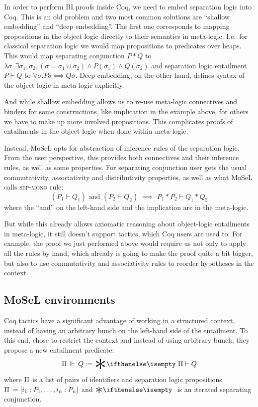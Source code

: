 In order to perform BI proofs inside Coq, we need to embed separation logic into Coq.
This is an old problem and two most common solutions are ``shallow embedding'' and ``deep embedding''.
The first one corresponds to mapping propositions in the object logic directly to their semantics in meta-logic.
I.e.\ for classical separation logic we would map propositions to predicates over heaps.
This would map separating conjunction \(P * Q\) to \(\lambda \sigma.\,\exists\sigma_1, \sigma_2.\, \left(\sigma = \sigma_1 \uplus \sigma_2\right) \wedge P (\sigma_1) \wedge Q(\sigma_2)\) and separation logic entailment \(P \vdash Q\) to \(\forall \sigma. P \sigma \implies Q \sigma\).
Deep embedding, on the other hand, defines syntax of the object logic in meta-logic explicitly.

And while shallow embedding allows us to re-use meta-logic connectives and binders for some constructions, like implication in the example above, for others we have to make up more involved propositions.
This complicates proofs of entailments in the object logic when done within meta-logic.

Instead, MoSeL opts for abstraction of inference rules of the separation logic.
From the user perspective, this provides both connectives and their inference rules, as well as some properties.
For separating conjunction user gets the usual commutativity, associativity and distributivity properties, as well as what MoSeL calls \textsc{sep-mono} rule:
\[(P_1 \vdash Q_1) \text{ and } (P_2 \vdash Q_2) \,\, \implies \,\, P_1 * P_2 \vdash Q_1 * Q_2\]
where the ``and'' on the left-hand side and the implication are in the meta-logic.

But while this already allows axiomatic reasoning about object-logic entailments in meta-logic, it still doesn't support tactics, which Coq users are used to.
For example, the proof we just performed above would require us not only to apply all the rules by hand, which already is going to make the proof quite a bit bigger, but also to
use commutativity and associativity rules to reorder hypotheses in the context.

\subsection{MoSeL environments}
\label{sec:mosel-environments}

Coq tactics have a significant advantage of working in a structured context, instead of having an arbitrary bunch on the left-hand side of the entailment.
To this end, \citet{krebbersInteractiveProofsHigherorder2017} chose to restrict the context and instead of using arbitrary bunch, they propose a new entailment predicate:
\[\entailsOneD Q \defeq \Sep \Pi \vdash Q\]
where \(\Pi\) is a list of pairs of identifiers and separation logic propositions \(\SpatD \defeq \left[i_1 : P_1, \ldots , i_n : P_n \right]\) and \(\Sep\) is an iterated separating conjunction.

